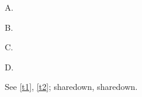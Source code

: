 \documentclass{article}
\begin{document}
\begin{theorem}\label{t1} A. \end{theorem}
\begin{remark} B. \end{remark}
\begin{note} C. \end{note}
\begin{theorem}\label{t2} D. \end{theorem}
\makeatletter See \ref{t1}, \ref{t2}; \ifx\c@note\c@theorem shared\else own\fi, \ifx\c@lemma\c@theorem shared\else own\fi.
\end{document}
